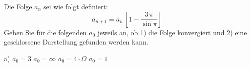 \begin{aufgabe}
Die Folge $a_n$ sei wie folgt definiert:
\begin{equation*}
a_{n+1} = a_n \, \left[1- \frac{3\, \pi}{\sin \pi} \right]
\end{equation*}
Geben Sie für die folgenden $a_0$ jeweils an, ob 1) die Folge konvergiert und 2) eine geschlossene Darstellung gefunden werden kann. 
\begin{multicols}{2}
\begin{teilaufgaben}{a)}
\teilaufgabe $a_0 = 3$
\teilaufgabe $a_0 = \infty$
\teilaufgabe $a_0 = 4 \cdot \Omega$
\teilaufgabe $a_0 = 1$
\end{teilaufgaben}
\end{multicols}

\end{aufgabe}
